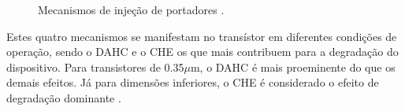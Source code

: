 \begin{figure}[H]
\center
{}
\hfill
{}
\hfill
{}
\hfill
{}
\caption{Mecanismos de injeção de portadores \cite{Maricau2013}.}
\label{figure:mecanismos_HCI}
\end{figure}
Estes quatro mecanismos se manifestam no transístor em diferentes condições de operação, sendo o DAHC e o CHE os que mais contribuem para a degradação do dispositivo. Para transistores de 0.35${\mu}$m, o DAHC é mais proeminente do que os demais efeitos. Já para dimensões inferiores, o CHE é considerado o efeito de degradação dominante \cite{Takeda1983}.
